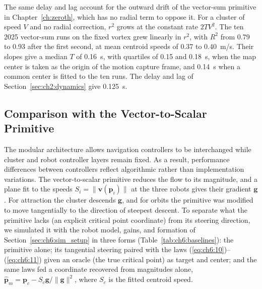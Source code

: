The same delay and lag account for the outward drift of the vector-sum
primitive in Chapter~\ref{ch:zeroth}, which has no radial term to oppose
it. For a cluster of speed $V$ and no radial correction, $r^2$ grows at
the constant rate $2TV^2$. The ten 2025 vector-sum runs on the fixed
vortex grew linearly in $r^2$, with $R^2$ from 0.79 to 0.93 after the
first second, at mean centroid speeds of 0.37 to 0.40~m/s. Their slopes
give a median $T$ of 0.16~s, with quartiles of 0.15 and 0.18~s, when the
map center is taken as the origin of the motion capture frame, and 0.14~s
when a common center is fitted to the ten runs. The delay and lag of
Section~\ref{sec:ch2:dynamics} give 0.125~s.

\subsection{Comparison with the Vector-to-Scalar Primitive}
\label{sec:ch6:comparison}

The modular architecture allows navigation controllers to be interchanged while cluster and robot controller layers remain fixed. As a result, performance differences between controllers reflect algorithmic rather than implementation variations.
The vector-to-scalar primitive \cite{26} reduces the flow to its magnitude, and a plane fit to the speeds $S_i = \|\mathbf{v}(\mathbf{p}_i)\|$ at the three robots gives their gradient $\mathbf{g}$. For attraction the cluster descends $\mathbf{g}$, and for orbits the primitive was modified to move tangentially to the direction of steepest descent. To separate what the primitive lacks (an explicit critical point coordinate) from its steering direction, we simulated it with the robot model, gains, and formation of Section~\ref{sec:ch6:sim_setup} in three forms (Table~\ref{tab:ch6:baselines}): the primitive alone; its tangential steering paired with the laws (\ref{eq:ch6:10})--(\ref{eq:ch6:11}) given an oracle (the true critical point) as target and center; and the same laws fed a coordinate recovered from magnitudes alone, $\hat{\mathbf{p}}_m = \mathbf{p}_c - S_c\mathbf{g}/\|\mathbf{g}\|^2$, where $S_c$ is the fitted centroid speed.

